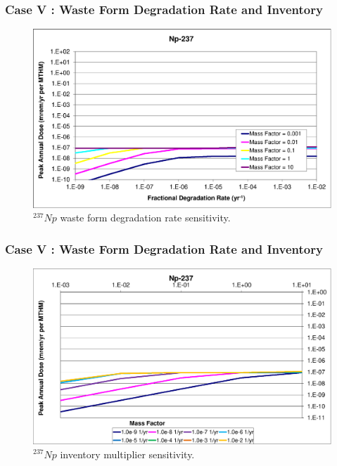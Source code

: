 \begin{frame}[c]
  \frametitle{Case V : Waste Form Degradation Rate and Inventory}

\begin{figure}[ht!]
\centering
\includegraphics[width=\linewidth]{WFDegAndInv/Np-237.eps}
\caption{$^{237}Np$ waste form degradation rate sensitivity.}
\label{fig:WFDegNp237}
\end{figure}
\end{frame}

\begin{frame}[c]
  \frametitle{Case V : Waste Form Degradation Rate and Inventory}

\begin{figure}[ht!]
\centering
\includegraphics[width=\linewidth]{WFDegAndInv/Np-237-MF.eps}
\caption{$^{237}Np$ inventory multiplier sensitivity.}
\label{fig:WFDegNp237MF}
\end{figure}

\end{frame}

